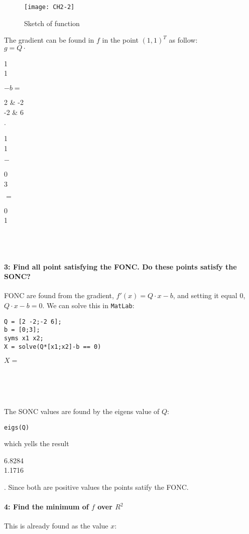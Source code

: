 \documentclass[Main]{subfiles}
\begin{document}
\begin{figure}[hbtp]
\centering
\texttt{[image: CH2-2]}
\vspace{-15pt}
\caption{Sketch of function}
\label{fig:ch2-2}
\end{figure}

The gradient can be found in $f$ in the point $(1,1)^T$ as follow:
\\
$g = Q \cdot$
\begin{ArgMat}
1 \\ 1
\end{ArgMat}
$- b = $
\begin{ArgMat}
2 & -2 \\
-2 & 6
\end{ArgMat}
$\cdot$
\begin{ArgMat}
1 \\ 1
\end{ArgMat}
$-$
\begin{ArgMat}
0 \\ 3
\end{ArgMat}
$=$
\begin{ArgMat}
0 \\ 1
\end{ArgMat}
\\
\\
\paragraph{3: Find all point satisfying the FONC. Do these points satisfy the SONC?}

FONC are found from the gradient, $f'(x) = Q \cdot x -b$, and setting it equal 0, $Q \cdot x -b = 0$.
We can solve this in \texttt{MatLab}:
\begin{lstlisting}[caption=FONC, style=Code-Matlab, label=lst:ch2-31]
Q = [2 -2;-2 6];
b = [0;3];
syms x1 x2;
X = solve(Q*[x1;x2]-b == 0)
\end{lstlisting}
$X = $
\begin{ArgMat}
 \\
\end{ArgMat}
\\\\
The SONC values are found by the eigens value of $Q$:
\begin{lstlisting}[caption=SONC, style=Code-Matlab, label=lst:ch2-32]
eigs(Q)
\end{lstlisting}
which yells the result 
\begin{ArgMat}
6.8284 \\
1.1716
\end{ArgMat}.
Since both are positive values the points satify the FONC.


\paragraph{4: Find the minimum of $f$ over $R^2$}
This is already found as the value $x$:
\begin{ArgMat}
 \\
\end{ArgMat}
\end{document}
